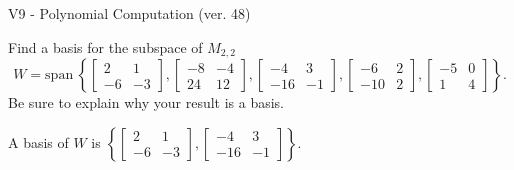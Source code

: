 \begin{exercise}
  \begin{exerciseTitle}V9 - Polynomial Computation (ver. 48)\end{exerciseTitle}
  \begin{exerciseStatement}
    Find a basis for the subspace of \(M_{2,2}\) 
\[W=\mathrm{span}\ \left\{\left[\begin{array}{cc}
2 & 1 \\
-6 & -3
\end{array}\right] , \left[\begin{array}{cc}
-8 & -4 \\
24 & 12
\end{array}\right] , \left[\begin{array}{cc}
-4 & 3 \\
-16 & -1
\end{array}\right] , \left[\begin{array}{cc}
-6 & 2 \\
-10 & 2
\end{array}\right] , \left[\begin{array}{cc}
-5 & 0 \\
1 & 4
\end{array}\right]\right\}.\]
 Be sure to explain why your result is a basis.


  \end{exerciseStatement}
  \begin{exerciseAnswer}
   A basis of \(W\) is  \(\left\{\left[\begin{array}{cc}
2 & 1 \\
-6 & -3
\end{array}\right] , \left[\begin{array}{cc}
-4 & 3 \\
-16 & -1
\end{array}\right]\right\}\).
  


  \end{exerciseAnswer}
\end{exercise}